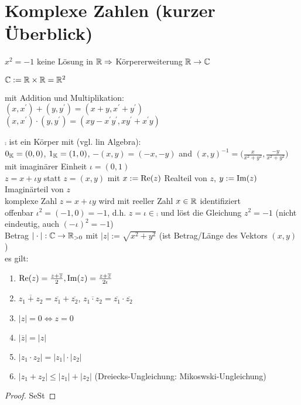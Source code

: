 \chapter{Komplexe Zahlen (kurzer Überblick)}
\begin{description}
	\item[Problem:] $x^2 = -1$ keine Lösung in $\mathbb{R} \Rightarrow$ Körpererweiterung $\mathbb{R} \to \mathbb{C}$
	\item[Betrachte Menge der komplexen Zahlen] $\mathbb{C} := \mathbb{R} \times \mathbb{R} = \mathbb{R}^2$
	\item mit Addition und Multiplikation:\\
	$(x,x^{'}) + (y,y^{'}) = (x+y, x^{'} + y^{'})$\\
	$(x,x^{'}) \cdot (y,y^{'}) = (xy - x^{'}y^{'}, xy^{'}+x^{'}y)$
	\item $\comp$ ist ein Körper mit (vgl. lin Algebra):\\
	$0_{\mathbb{K}} = (0,0)$,  $1_{\mathbb{K}} = (1,0)$, $-(x,y) = (-x,-y)$ and $(x,y)^{-1} = \bigg(\frac{x}{x^2+y^2},\frac{-y}{x^2+y^2}\bigg)$\\
	mit imaginärer Einheit $\iota=(0,1)$\\
	$z=x+\iota y$ statt $z=(x,y)$ mit $x:=\operatorname{Re}(z)$ Realteil von $z$, $y:= \operatorname{Im}(z)$ Imaginärteil von $z$\\
	komplexe Zahl $z=x + \iota y$ wird mit reeller Zahl $x \in \mathbb{R}$ identifiziert\\
	offenbar $\iota^2=(-1,0)=-1$, d.h. $z=\iota \in \comp$ und löst die Gleichung $z^2=-1$ (nicht eindeutig, auch $(-\iota)^2 = -1$)\\
	Betrag $|\cdot|: \mathbb{C} \to \mathbb{R}_{> 0}$ mit $|z|:= \sqrt{x^2+y^2}$ (ist Betrag/Länge des Vektors $(x,y)$)\\
	es gilt:
	\begin{enumerate}[label={\alph*)}]
		\item $\operatorname{Re}(z) = \frac{z+\overline{z}}{2}, \operatorname{Im}(z) = \frac{z+\overline{z}}{2\iota}$
		\item $\overline{z_1 + z_2} = \overline{z_1} + \overline{z_2}$, $\overline{z_1 \cdot z_2} = \overline{z_1} \cdot \overline{z_2}$
		\item $|z| = 0 \iff z=0$
		\item $|\overline{z}| = |z|$
		\item $|z_1 \cdot z_2| = |z_1| \cdot |z_2|$
		\item $|z_1 + z_2| \leq |z_1| + |z_2|$ (Dreiecks-Ungleichung: Mikoswski-Ungleichung)
	\end{enumerate}
\begin{proof}
	SeSt \QEDA
\end{proof}
\end{description}